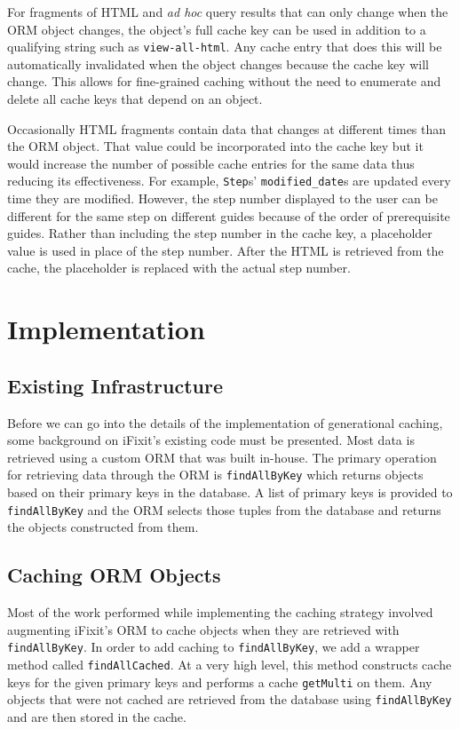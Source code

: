 \documentclass[12pt]{ucthesis}
\begin{document}
For fragments of HTML and \textit{ad hoc} query results that can only change when the ORM object changes, the object's full cache key can be used in addition to a qualifying string such as {\tt view-all-html}.
Any cache entry that does this will be automatically invalidated when the object changes because the cache key will change.
This allows for fine-grained caching without the need to enumerate and delete all cache keys that depend on an object.

Occasionally HTML fragments contain data that changes at different times than the ORM object.
That value could be incorporated into the cache key but it would increase the number of possible cache entries for the same data thus reducing its effectiveness.
For example, {\tt Step}s' {\tt modified\_date}s are updated every time they are modified.
However, the step number displayed to the user can be different for the same step on different guides because of the order of prerequisite guides.
Rather than including the step number in the cache key, a placeholder value is used in place of the step number.
After the HTML is retrieved from the cache, the placeholder is replaced with the actual step number.


\section{Implementation} \label{implementation}
\subsection{Existing Infrastructure}
Before we can go into the details of the implementation of generational caching, some background on \textsf{iFixit}'s existing code must be presented.
Most data is retrieved using a custom ORM that was built in-house.
The primary operation for retrieving data through the ORM is {\tt findAllByKey} which returns objects based on their primary keys in the database.
A list of primary keys is provided to {\tt findAllByKey} and the ORM selects those tuples from the database and returns the objects constructed from them.

\subsection{Caching ORM Objects}
Most of the work performed while implementing the caching strategy involved augmenting \textsf{iFixit}'s ORM to cache objects when they are retrieved with {\tt findAllByKey}.
In order to add caching to {\tt findAllByKey}, we add a wrapper method called {\tt findAllCached}.
At a very high level, this method constructs cache keys for the given primary keys and performs a cache {\tt getMulti} on them.
Any objects that were not cached are retrieved from the database using {\tt findAllByKey} and are then stored in the cache.
\end{document}
